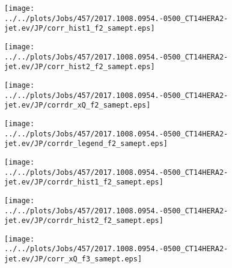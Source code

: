 \documentclass[12pt]{article}
\begin{document}
\begin{figure}
\texttt{[image: ../../plots/Jobs/457/2017.1008.0954.-0500\_CT14HERA2-jet.ev/JP/corr\_hist1\_f2\_samept.eps]}
\caption{}
\end{figure}\newpage\clearpage
\begin{figure}
\texttt{[image: ../../plots/Jobs/457/2017.1008.0954.-0500\_CT14HERA2-jet.ev/JP/corr\_hist2\_f2\_samept.eps]}
\caption{}
\end{figure}\newpage\clearpage
\begin{figure}
\texttt{[image: ../../plots/Jobs/457/2017.1008.0954.-0500\_CT14HERA2-jet.ev/JP/corrdr\_xQ\_f2\_samept.eps]}
\caption{}
\end{figure}\newpage\clearpage
\begin{figure}
\texttt{[image: ../../plots/Jobs/457/2017.1008.0954.-0500\_CT14HERA2-jet.ev/JP/corrdr\_legend\_f2\_samept.eps]}
\caption{}
\end{figure}\newpage\clearpage
\begin{figure}
\texttt{[image: ../../plots/Jobs/457/2017.1008.0954.-0500\_CT14HERA2-jet.ev/JP/corrdr\_hist1\_f2\_samept.eps]}
\caption{}
\end{figure}\newpage\clearpage
\begin{figure}
\texttt{[image: ../../plots/Jobs/457/2017.1008.0954.-0500\_CT14HERA2-jet.ev/JP/corrdr\_hist2\_f2\_samept.eps]}
\caption{}
\end{figure}\newpage\clearpage
\begin{figure}
\texttt{[image: ../../plots/Jobs/457/2017.1008.0954.-0500\_CT14HERA2-jet.ev/JP/corr\_xQ\_f3\_samept.eps]}
\caption{}
\end{figure}\newpage\clearpage
\end{document}

